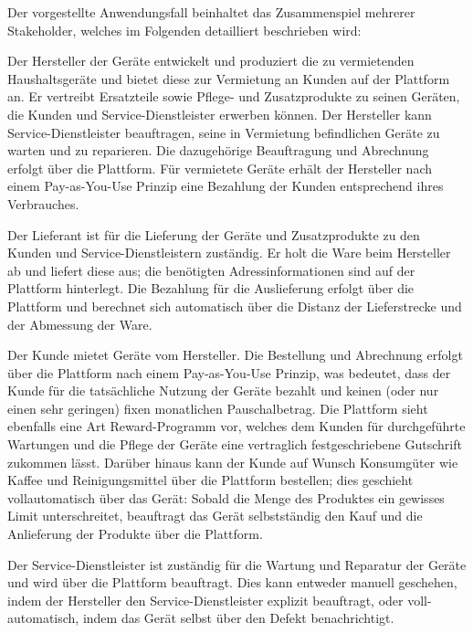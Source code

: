 Der vorgestellte Anwendungsfall beinhaltet das Zusammenspiel mehrerer Stakeholder, welches im Folgenden detailliert beschrieben wird:
\begin{description}
\label{description:chapter04:stakeholder}
  \item[Hersteller] Der Hersteller der Geräte entwickelt und produziert die zu vermietenden Haushaltsgeräte und bietet diese zur Vermietung an Kunden auf der Plattform an. Er vertreibt Ersatzteile sowie Pflege- und Zusatzprodukte zu seinen Geräten, die Kunden und Service-Dienstleister erwerben können. Der Hersteller kann Service-Dienstleister beauftragen, seine in Vermietung befindlichen Geräte zu warten und zu reparieren. Die dazugehörige Beauftragung und Abrechnung erfolgt über die Plattform. Für vermietete Geräte erhält der Hersteller nach einem Pay-as-You-Use Prinzip eine Bezahlung der Kunden entsprechend ihres Verbrauches.
  \item[Lieferant] Der Lieferant ist für die Lieferung der Geräte und Zusatzprodukte zu den Kunden und Service-Dienstleistern zuständig. Er holt die Ware beim Hersteller ab und liefert diese aus; die benötigten Adressinformationen sind auf der Plattform hinterlegt. Die Bezahlung für die Auslieferung erfolgt über die Plattform und berechnet sich automatisch über die Distanz der Lieferstrecke und der Abmessung der Ware.
  \item[Kunde] Der Kunde mietet Geräte vom Hersteller. Die Bestellung und Abrechnung erfolgt über die Plattform nach einem Pay-as-You-Use Prinzip, was bedeutet, dass der Kunde für die tatsächliche Nutzung der Geräte bezahlt und keinen (oder nur einen sehr geringen) fixen monatlichen Pauschalbetrag. Die Plattform sieht ebenfalls eine Art Reward-Programm vor, welches dem Kunden für durchgeführte Wartungen und die Pflege der Geräte eine vertraglich festgeschriebene Gutschrift zukommen lässt. Darüber hinaus kann der Kunde auf Wunsch Konsumgüter wie Kaffee und Reinigungsmittel über die Plattform bestellen; dies geschieht vollautomatisch über das Gerät: Sobald die Menge des Produktes ein gewisses Limit unterschreitet, beauftragt das Gerät selbstständig den Kauf und die Anlieferung der Produkte über die Plattform.
  \item[Service-Dienstleister] Der Service-Dienstleister ist zuständig für die Wartung und Reparatur der Geräte und wird über die Plattform beauftragt. Dies kann entweder manuell geschehen, indem der Hersteller den Service-Dienstleister explizit beauftragt, oder voll-automatisch, indem das Gerät selbst über den Defekt benachrichtigt.
\end{description}

